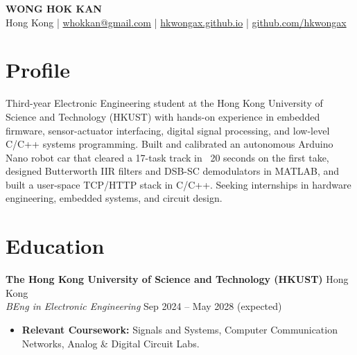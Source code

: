 \documentclass[10pt,a4paper]{article}
\begin{document}
\begin{center}
  {\LARGE\bfseries WONG HOK KAN}\\[3pt]
  {\small\color{muted}
    Hong Kong \enspace|\enspace
    \href{mailto:whokkan@gmail.com}{whokkan@gmail.com} \enspace|\enspace
    \href{https://hkwongax.github.io/}{hkwongax.github.io} \enspace|\enspace
    \href{https://github.com/hkwongax}{github.com/hkwongax}
  }
\end{center}
\vspace{1pt}

\section{Profile}
Third-year Electronic Engineering student at the Hong Kong University of Science and Technology (HKUST) with hands-on experience in embedded firmware, sensor-actuator interfacing, digital signal processing, and low-level C/C++ systems programming. Built and calibrated an autonomous Arduino Nano robot car that cleared a 17-task track in ~20 seconds on the first take, designed Butterworth IIR filters and DSB-SC demodulators in MATLAB, and built a user-space TCP/HTTP stack in C/C++. Seeking internships in hardware engineering, embedded systems, and circuit design.

\section{Education}
\textbf{The Hong Kong University of Science and Technology (HKUST)} \hfill Hong Kong\\
\textit{BEng in Electronic Engineering} \hfill Sep 2024 -- May 2028 (expected)
\begin{itemize}
  \item \textbf{Relevant Coursework:} Signals and Systems, Computer Communication Networks, Analog \& Digital Circuit Labs.
\end{itemize}

\end{document}
